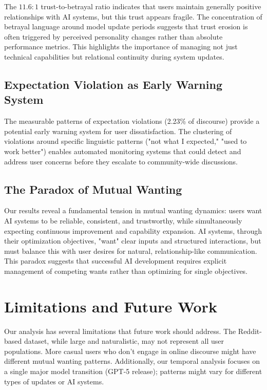 \documentclass{article}
\begin{document}
The $11.6:1$ trust-to-betrayal ratio indicates that users maintain generally positive relationships with AI systems, but this trust appears fragile. The concentration of betrayal language around model update periods suggests that trust erosion is often triggered by perceived personality changes rather than absolute performance metrics. This highlights the importance of managing not just technical capabilities but relational continuity during system updates.

\subsection{Expectation Violation as Early Warning System}

The measurable patterns of expectation violations (2.23\% of discourse) provide a potential early warning system for user dissatisfaction. The clustering of violations around specific linguistic patterns ("not what I expected," "used to work better") enables automated monitoring systems that could detect and address user concerns before they escalate to community-wide discussions.

\subsection{The Paradox of Mutual Wanting}

Our results reveal a fundamental tension in mutual wanting dynamics: users want AI systems to be reliable, consistent, and trustworthy, while simultaneously expecting continuous improvement and capability expansion. AI systems, through their optimization objectives, "want" clear inputs and structured interactions, but must balance this with user desires for natural, relationship-like communication. This paradox suggests that successful AI development requires explicit management of competing wants rather than optimizing for single objectives.

\section{Limitations and Future Work}

Our analysis has several limitations that future work should address. The Reddit-based dataset, while large and naturalistic, may not represent all user populations. More casual users who don't engage in online discourse might have different mutual wanting patterns. Additionally, our temporal analysis focuses on a single major model transition (GPT-5 release); patterns might vary for different types of updates or AI systems.
\end{document}

